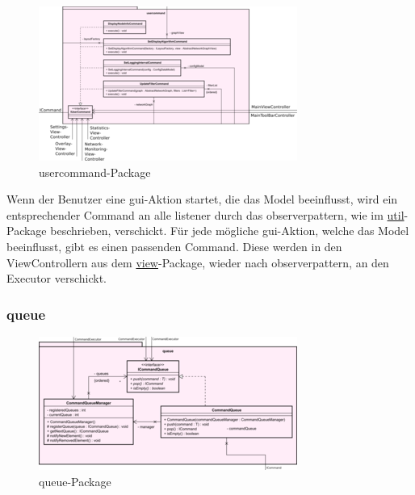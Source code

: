       \begin{figure}[H]
        \centering
        \includegraphics[width=\textwidth]{../diagramimages/usercommand.png}
        \caption{usercommand-Package}
      \end{figure}

      \medskip
      Wenn der Benutzer eine \gls{gui}-Aktion startet, die das Model beeinflusst,
      wird ein entsprechender Command an alle \gls{listener} durch das \gls{observerpattern}, wie im
      \hyperref[subsec:util]{util}-Package beschrieben, verschickt. Für jede mögliche
      \gls{gui}-Aktion, welche das Model beeinflusst, gibt es einen passenden Command.
      Diese werden in den ViewControllern aus dem \hyperref[subsec:view]{view}-Package, wieder nach \gls{observerpattern},
      an den Executor verschickt.

      \subsubsection{queue}
      \label{subsubsec:queue}

      \begin{figure}[H]
        \centering
        \includegraphics[width=\textwidth]{../diagramimages/queue.png}
        \caption{queue-Package}
      \end{figure}

